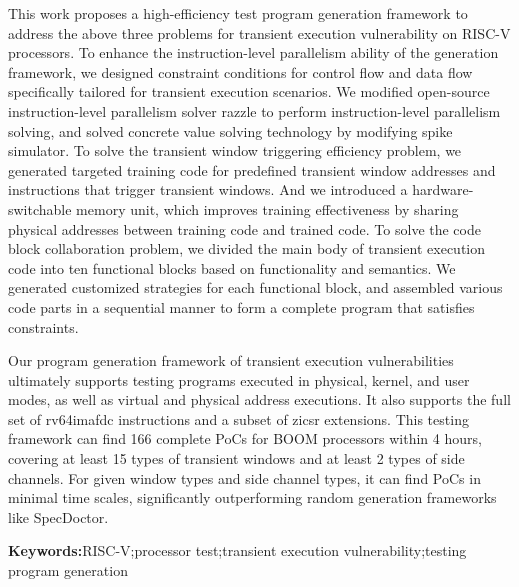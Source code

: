 This work proposes a high-efficiency test program generation framework
to address the above three problems for transient execution vulnerability on RISC-V processors.
To enhance the instruction-level parallelism ability of the generation framework, 
we designed constraint conditions for control flow and data flow specifically tailored for transient execution scenarios. 
We modified open-source instruction-level parallelism solver razzle to perform instruction-level parallelism solving, 
and solved concrete value solving technology by modifying spike simulator.
To solve the transient window triggering efficiency problem,
we generated targeted training code for predefined transient window addresses and instructions 
that trigger transient windows. 
And we introduced a hardware-switchable memory unit, 
which improves training effectiveness by sharing physical addresses between training code and trained code.
To solve the code block collaboration problem, 
we divided the main body of transient execution code into ten functional blocks based on functionality and semantics. 
We generated customized strategies for each functional block, 
and assembled various code parts in a sequential manner 
to form a complete program that satisfies constraints.\par

Our program generation framework of transient execution vulnerabilities 
ultimately supports testing programs executed in physical, kernel, and user modes, 
as well as virtual and physical address executions. 
It also supports the full set of rv64imafdc instructions and a subset of zicsr extensions. 
This testing framework can find 166 complete PoCs for BOOM processors within 4 hours, 
covering at least 15 types of transient windows and at least 2 types of side channels. 
For given window types and side channel types, it can find PoCs in minimal time scales, 
significantly outperforming random generation frameworks like SpecDoctor.\par

\textbf{Keywords:}RISC-V;processor test;transient execution vulnerability;testing program generation


